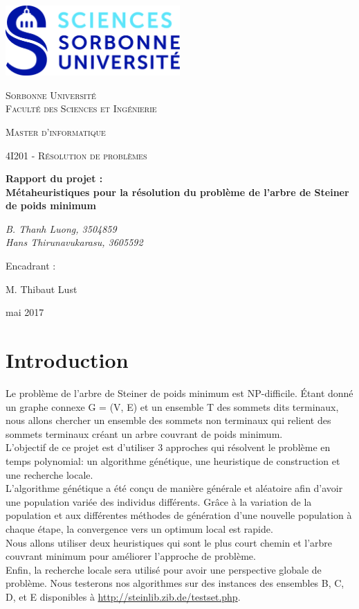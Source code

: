 \documentclass[12pt,a4paper]{article}
\begin{document}
\begin{titlepage}
	\centering
	\includegraphics[width=0.5\textwidth]{SU.jpg}\par\vspace{1cm}
	{\scshape\LARGE Sorbonne Université\\ Faculté des Sciences et Ingénierie \par}
	\vspace{1cm}
	{\scshape\large Master d'informatique \par}
	\vspace{1cm}
	{\scshape\Large 4I201 - Résolution de problèmes\par}
	\vspace{1.5cm}
	{\huge\bfseries Rapport du projet :\\
		Métaheuristiques pour la résolution du
		problème de l’arbre de Steiner de poids minimum\par}
	\vspace{2cm}
	{\Large\itshape B. Thanh Luong, 3504859 \\      Hans Thirunavukarasu, 3605592\par}
	\vfill
	Encadrant :\par
	M. Thibaut Lust
	\vfill

	{\large mai 2017\par}
\end{titlepage}
\newpage
\tableofcontents
\newpage
\section{Introduction}
Le problème de l’arbre de Steiner de poids minimum est NP-difficile. Étant donné un graphe connexe G = (V, E) et un ensemble T des sommets dits terminaux, nous allons chercher un ensemble des sommets non terminaux qui relient des sommets terminaux créant un arbre couvrant de poids minimum.\\
L'objectif de ce projet est d'utiliser 3 approches qui résolvent le problème en temps polynomial: un algorithme génétique, une heuristique de construction et une recherche locale.\\
L'algorithme génétique a été conçu de manière générale et aléatoire afin d'avoir une population variée des individus différents. Grâce à la variation de la population et 
aux différentes méthodes de génération d'une nouvelle population à chaque étape, la convergence vers un optimum local est rapide.\\
Nous allons utiliser deux heuristiques qui sont le plus court chemin et l'arbre couvrant minimum pour améliorer l'approche de problème.\\
Enfin, la recherche locale sera utilisé pour avoir une perspective globale de problème.
Nous testerons nos algorithmes sur des instances des ensembles B, C, D, et E disponibles à \hyperlink{http://steinlib.zib.de/testset.php}{http://steinlib.zib.de/testset.php}.
\end{document}
